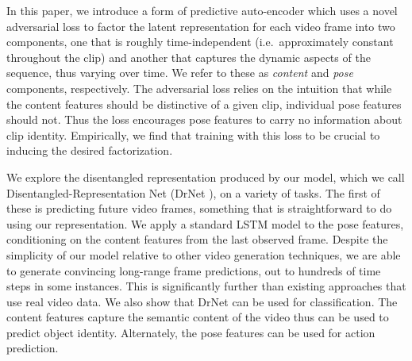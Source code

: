 \documentclass{article}
\newcommand{\drnet}{{\sc DrNet} }
\begin{document}
In this paper, we introduce a form of predictive auto-encoder which uses a novel adversarial loss to factor the latent representation for each video frame into two components, one that is roughly time-independent (i.e.~approximately constant throughout the clip) and another that captures the dynamic aspects of the sequence, thus varying over time. We refer to these as {\em content} and {\em pose} components, respectively. The adversarial loss relies on the intuition that while the content features should be distinctive of a given clip, individual pose features should not. Thus the loss encourages pose features to carry no information about clip identity. Empirically, we find that training with this loss to be crucial to inducing the desired factorization. 

We explore the disentangled representation produced by our model, which we call Disentangled-Representation Net (\drnet), on a variety of tasks. The first of these is predicting future video frames, something that is straightforward to do using our representation. We apply a standard LSTM model to the pose features, conditioning on the content features from the last observed frame. Despite the simplicity of our model relative to other video generation techniques, we are able to generate convincing long-range frame predictions, out to hundreds of time steps in some instances. This is significantly further than existing approaches that use real video data. 
We also show that \drnet can be used for classification. The content features capture the semantic content of the video thus can be used to predict object identity. Alternately, the pose features can be used for action prediction. 
\end{document}

